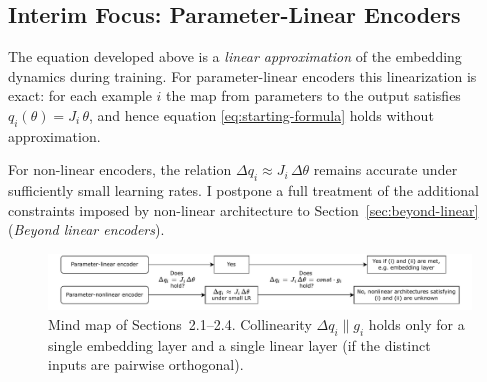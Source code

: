 \subsection{Interim Focus: Parameter-Linear Encoders}

The equation developed above is a \emph{linear approximation} of the embedding dynamics during training. For parameter-linear encoders this linearization is exact: for each example $i$ the map from parameters to the output satisfies $q_i(\theta)=J_i\,\theta$, and hence equation \eqref{eq:starting-formula} holds without approximation.

For non-linear encoders, the relation $\Delta q_i \approx J_i\,\Delta\theta$ remains accurate under sufficiently small learning rates. I postpone a full treatment of the additional constraints imposed by non-linear architecture to Section~\ref{sec:beyond-linear} (\emph{Beyond linear encoders}).

\begin{figure}[t]
\includegraphics[width=\textwidth]{../draft_materials/figure_1_paper.pdf}
\caption{Mind map of Sections~2.1--2.4. Collinearity $\Delta q_i \parallel g_i$ holds only for a single embedding layer and a single linear layer (if the distinct inputs are pairwise orthogonal).}
\label{fig:sec2-mindmap}
\end{figure}